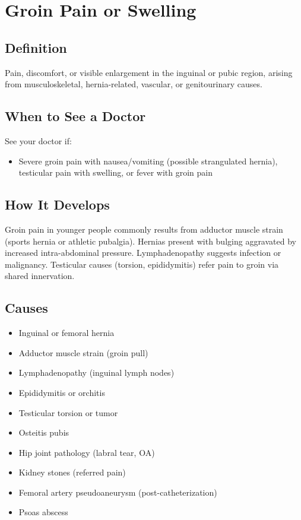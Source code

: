 \chapter{Groin Pain or Swelling}

\section*{Definition}
Pain, discomfort, or visible enlargement in the inguinal or pubic region, arising from musculoskeletal, hernia-related, vascular, or genitourinary causes.

\section*{When to See a Doctor}
See your doctor if:
\begin{itemize}
  \item Severe groin pain with nausea/vomiting (possible strangulated hernia), testicular pain with swelling, or fever with groin pain
\end{itemize}

\section*{How It Develops}
Groin pain in younger people commonly results from adductor muscle strain (sports hernia or athletic pubalgia). Hernias present with bulging aggravated by increased intra-abdominal pressure. Lymphadenopathy suggests infection or malignancy. Testicular causes (torsion, epididymitis) refer pain to groin via shared innervation.

\section*{Causes}
\begin{itemize}
  \item Inguinal or femoral hernia
  \item Adductor muscle strain (groin pull)
  \item Lymphadenopathy (inguinal lymph nodes)
  \item Epididymitis or orchitis
  \item Testicular torsion or tumor
  \item Osteitis pubis
  \item Hip joint pathology (labral tear, OA)
  \item Kidney stones (referred pain)
  \item Femoral artery pseudoaneurysm (post-catheterization)
  \item Psoas abscess
\end{itemize}

